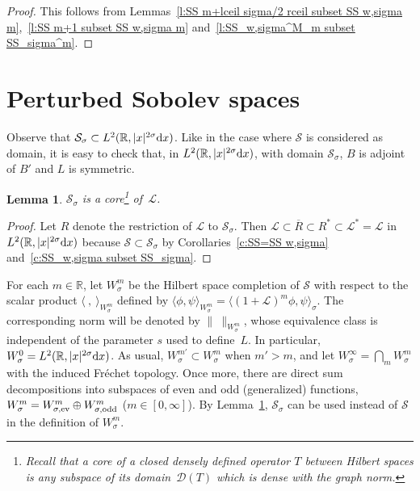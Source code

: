 \documentclass[pdftex]{sigma}
\newtheorem{Lemma}[Theorem]{Lemma}
\newcommand{\R}{\mathbb{R}}
\newcommand{\DD}{\mathcal{D}}
\newcommand{\LL}{\mathcal{L}}
\renewcommand{\SS}{\mathcal{S}}
\begin{document}
\begin{proof}
  This follows from Lemmas~\ref{l:SS m+lceil sigma/2 rceil subset SS w,sigma m},~\ref{l:SS m+1 subset SS w,sigma m} and~\ref{l:SS_w,sigma^M_m subset SS_sigma^m}.
\end{proof}



\section{Perturbed Sobolev spaces}\label{s:W sigma m}

Observe that $\SS_\sigma\subset L^2(\R,|x|^{2\sigma}{\rm d}x)$. Like in the case where $\SS$ is considered as domain, it is easy to check that, in $L^2(\R,|x|^{2\sigma}{\rm d}x)$, with domain $\SS_\sigma$, $B$ is adjoint of $B'$ and $L$ is symmetric.

\begin{Lemma}\label{l:SS_sigma is a core of LL}
   $\SS_\sigma$ is a core\footnote{Recall that a {\em core\/} of a closed densely def\/ined operator $T$ between Hilbert spaces is any subspace of its domain~$\DD(T)$ which is dense with the graph norm.} of~$\LL$.
\end{Lemma}

\begin{proof}
  Let $R$ denote the restriction of $\LL$ to $\SS_\sigma$. Then $\LL\subset\overline{R}\subset R^*\subset\LL^*=\LL$ in $L^2(\R,|x|^{2\sigma}{\rm d}x)$ because $\SS\subset\SS_\sigma$ by Corollaries~\ref{c:SS=SS w,sigma} and~\ref{c:SS_w,sigma subset SS_sigma}.
\end{proof}

For each $m\in\R$, let $W_\sigma^m$ be the Hilbert space completion of $\SS$ with respect to the scalar product $\langle\ ,\ \rangle_{W_\sigma^m}$ def\/ined by $\langle\phi,\psi\rangle_{W_\sigma^m}=\langle(1+\LL)^m\phi,\psi\rangle_\sigma$. The corresponding norm will be denoted by $\|\ \|_{W_\sigma^m}$,
whose equivalence class is independent of the parameter $s$ used to def\/ine~$L$. In particular,
$W_\sigma^0=L^2(\R,|x|^{2\sigma}{\rm d}x)$. As usual, $W_\sigma^{m'}\subset
W_\sigma^m$ when $m'>m$,  and let
$W_\sigma^\infty=\bigcap_mW_\sigma^m$ with the
induced Fr\'echet topology. Once more, there are direct sum decompositions into subspaces of even and odd (generalized) functions, $W_\sigma^m=W_{\sigma,\text{\rm ev}}^m\oplus W_{\sigma,\text{\rm odd}}^m$ ($m\in[0,\infty]$). By Lemma~\ref{l:SS_sigma is a core of LL}, $\SS_\sigma$ can be used instead of $\SS$ in the def\/inition of $W_\sigma^m$.
\end{document}
